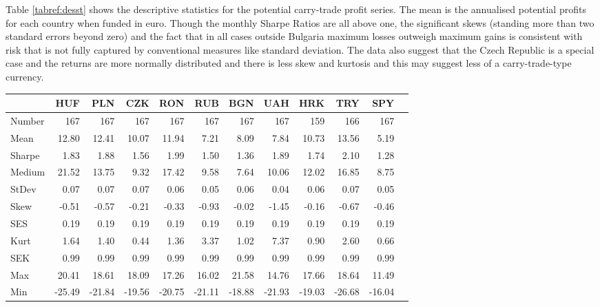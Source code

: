 \documentclass[12pt, a4paper, oneside]{article}\usepackage[]{graphicx}\usepackage[]{color}
\begin{document}
Table \ref{tabref:desst} shows the descriptive statistics for the potential carry-trade profit series. The mean is the annualised potential profits for each country when funded in euro.  Though the monthly Sharpe Ratios are all above one, the significant skews (standing more than two standard errors beyond zero) and the fact that in all cases outside Bulgaria maximum losses outweigh maximum gains is consistent with risk that is not fully captured by conventional measures like standard deviation. The data also suggest that the Czech Republic is a special case and the returns are more normally distributed and there is less skew and kurtosis and this may suggest less of a carry-trade-type currency.  

\begin{sidewaystable}[p]
\begin{threeparttable}
\centering
\begin{tabular}{lrrrrrrrrrrr}
  \hline
 & HUF & PLN & CZK & RON & RUB & BGN & UAH & HRK & TRY & SPY\\ 
  \hline
Number & 167 & 167 & 167 & 167 & 167 & 167 & 167 & 159 & 166 & 167\\ 
  Mean & 12.80 & 12.41 & 10.07 & 11.94 & 7.21 & 8.09 & 7.84 & 10.73 & 13.56 & 5.19\\ 
  Sharpe & 1.83 & 1.88 & 1.56 & 1.99 & 1.50 & 1.36 & 1.89 & 1.74 & 2.10 & 1.28 \\ 
  Medium & 21.52 & 13.75 & 9.32 & 17.42 & 9.58 & 7.64 & 10.06 & 12.02 & 16.85 & 8.75 \\ 
  StDev & 0.07 & 0.07 & 0.07 & 0.06 & 0.05 & 0.06 & 0.04 & 0.06 & 0.07 & 0.05 \\ 
  Skew & -0.51 & -0.57 & -0.21 & -0.33 & -0.93 & -0.02 & -1.45 & -0.16 & -0.67 & -0.46 \\ 
  SES & 0.19 & 0.19 & 0.19 & 0.19 & 0.19 & 0.19 & 0.19 & 0.19 & 0.19 & 0.19\\ 
  Kurt & 1.64 & 1.40 & 0.44 & 1.36 & 3.37 & 1.02 & 7.37 & 0.90 & 2.60 & 0.66\\ 
  SEK & 0.99 & 0.99 & 0.99 & 0.99 & 0.99 & 0.99 & 0.99 & 0.99 & 0.99 & 0.99\\ 
  Max & 20.41 & 18.61 & 18.09 & 17.26 & 16.02 & 21.58 & 14.76 & 17.66 & 18.64 & 11.49\\ 
  Min & -25.49 & -21.84 & -19.56 & -20.75 & -21.11 & -18.88 & -21.93 & -19.03 & -26.68 & -16.04\\ 
   \hline

\end{tabular}
\end{threeparttable}
\end{sidewaystable}
\end{document}
